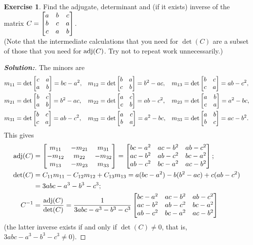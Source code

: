 \documentclass[a4paper]{amsart}
\theoremstyle{definition}
\newtheorem{exercise}{Exercise}
\newenvironment{solution}{\begin{proof}[\textbf{Solution:}] \vphantom{u}}{\end{proof}}
\begin{document}
\begin{exercise}\label{ex-adjugate-circulant}
 Find the adjugate, determinant and (if it exists) inverse of the matrix
 $C=\left[\begin{matrix} a & b & c \\
         b & c & a \\
         c & a & b \end{matrix}\right]$.  \\
 (Note that the intermediate calculations that you need for $\det(C)$
 are a subset of those that you need for $\operatorname{adj}(C)$.  Try not to repeat
 work unnecessarily.)
\end{exercise}
\begin{solution}
 The minors are 
 \begin{align*}
  m_{11} &= \det\left[\begin{matrix} c & a \\ a & b \end{matrix}\right] = bc-a^2, &
  m_{12} &= \det\left[\begin{matrix} b & a \\ c & b \end{matrix}\right] = b^2-ac, &
  m_{13} &= \det\left[\begin{matrix} b & c \\ c & a \end{matrix}\right] = ab-c^2, \\
  m_{21} &= \det\left[\begin{matrix} b & c \\ a & b \end{matrix}\right] = b^2-ac, &
  m_{22} &= \det\left[\begin{matrix} a & c \\ c & b \end{matrix}\right] = ab-c^2, &
  m_{23} &= \det\left[\begin{matrix} a & b \\ c & a \end{matrix}\right] = a^2-bc, \\
  m_{31} &= \det\left[\begin{matrix} b & c \\ c & a \end{matrix}\right] = ab-c^2, &
  m_{32} &= \det\left[\begin{matrix} a & c \\ b & a \end{matrix}\right] = a^2-bc, &
  m_{33} &= \det\left[\begin{matrix} a & b \\ b & c \end{matrix}\right] = ac-b^2. 
 \end{align*}
 This gives
 \begin{align*} 
  \operatorname{adj}(C) &= \left[\begin{matrix}  m_{11} & -m_{21} &  m_{31} \\
                  -m_{12} &  m_{22} & -m_{32} \\
                   m_{13} & -m_{23} &  m_{33} \end{matrix}\right] 
           = \left[\begin{matrix}  bc-a^2 & ac-b^2 & ab-c^2 \\
                   ac-b^2 & ab-c^2 & bc-a^2 \\
                   ab-c^2 & bc-a^2 & ac-b^2 \end{matrix}\right] ;
                   \\
  \det(C) &= C_{11}m_{11} - C_{12}m_{12} + C_{13}m_{13} 
           = a(bc-a^2) - b(b^2-ac) + c(ab-c^2) \\
          &= 3abc-a^3-b^3-c^3 ; \\
  C^{-1}  &= \frac{\operatorname{adj}(C)}{\det(C)} 
           = \frac{1}{3abc-a^3-b^3-c^3}
             \left[\begin{matrix}  bc-a^2 & ac-b^2 & ab-c^2 \\
                   ac-b^2 & ab-c^2 & bc-a^2 \\
                   ab-c^2 & bc-a^2 & ac-b^2 \end{matrix}\right]
 \end{align*}
 (the latter inverse exists if and only if $\det(C) \neq 0$,
 that is, $3abc-a^3-b^3-c^3 \neq 0$).
\end{solution}
\end{document}
